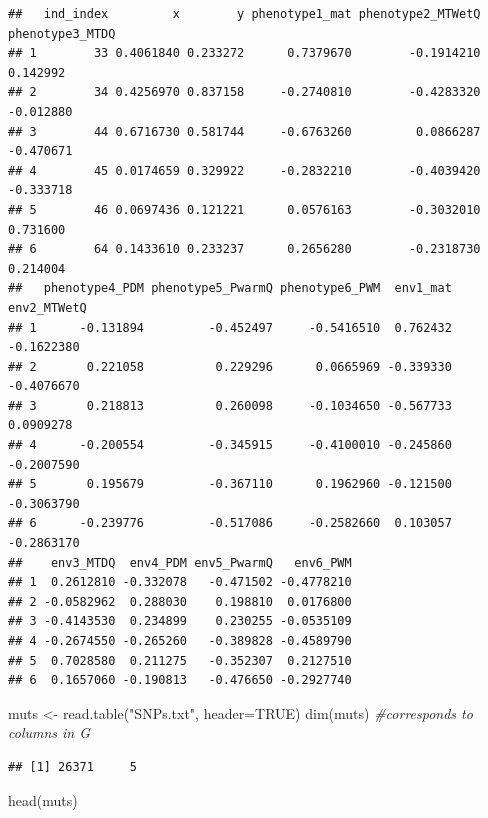 \documentclass[
]{article}
\newenvironment{Shaded}{\begin{snugshade}}{\end{snugshade}}
\newcommand{\AttributeTok}[1]{\textcolor[rgb]{0.77,0.63,0.00}{#1}}
\newcommand{\CommentTok}[1]{\textcolor[rgb]{0.56,0.35,0.01}{\textit{#1}}}
\newcommand{\ConstantTok}[1]{\textcolor[rgb]{0.00,0.00,0.00}{#1}}
\newcommand{\FunctionTok}[1]{\textcolor[rgb]{0.00,0.00,0.00}{#1}}
\newcommand{\NormalTok}[1]{#1}
\newcommand{\OtherTok}[1]{\textcolor[rgb]{0.56,0.35,0.01}{#1}}
\newcommand{\StringTok}[1]{\textcolor[rgb]{0.31,0.60,0.02}{#1}}
\begin{document}
\begin{verbatim}
##   ind_index         x        y phenotype1_mat phenotype2_MTWetQ phenotype3_MTDQ
## 1        33 0.4061840 0.233272      0.7379670        -0.1914210        0.142992
## 2        34 0.4256970 0.837158     -0.2740810        -0.4283320       -0.012880
## 3        44 0.6716730 0.581744     -0.6763260         0.0866287       -0.470671
## 4        45 0.0174659 0.329922     -0.2832210        -0.4039420       -0.333718
## 5        46 0.0697436 0.121221      0.0576163        -0.3032010        0.731600
## 6        64 0.1433610 0.233237      0.2656280        -0.2318730        0.214004
##   phenotype4_PDM phenotype5_PwarmQ phenotype6_PWM  env1_mat env2_MTWetQ
## 1      -0.131894         -0.452497     -0.5416510  0.762432  -0.1622380
## 2       0.221058          0.229296      0.0665969 -0.339330  -0.4076670
## 3       0.218813          0.260098     -0.1034650 -0.567733   0.0909278
## 4      -0.200554         -0.345915     -0.4100010 -0.245860  -0.2007590
## 5       0.195679         -0.367110      0.1962960 -0.121500  -0.3063790
## 6      -0.239776         -0.517086     -0.2582660  0.103057  -0.2863170
##    env3_MTDQ  env4_PDM env5_PwarmQ   env6_PWM
## 1  0.2612810 -0.332078   -0.471502 -0.4778210
## 2 -0.0582962  0.288030    0.198810  0.0176800
## 3 -0.4143530  0.234899    0.230255 -0.0535109
## 4 -0.2674550 -0.265260   -0.389828 -0.4589790
## 5  0.7028580  0.211275   -0.352307  0.2127510
## 6  0.1657060 -0.190813   -0.476650 -0.2927740
\end{verbatim}

\begin{Shaded}
\begin{Highlighting}[]
\NormalTok{muts }\OtherTok{\textless{}{-}}  \FunctionTok{read.table}\NormalTok{(}\StringTok{"SNPs.txt"}\NormalTok{, }\AttributeTok{header=}\ConstantTok{TRUE}\NormalTok{)}
\FunctionTok{dim}\NormalTok{(muts) }\CommentTok{\#corresponds to columns in G}
\end{Highlighting}
\end{Shaded}

\begin{verbatim}
## [1] 26371     5
\end{verbatim}

\begin{Shaded}
\begin{Highlighting}[]
\FunctionTok{head}\NormalTok{(muts)}
\end{Highlighting}
\end{Shaded}
\end{document}
